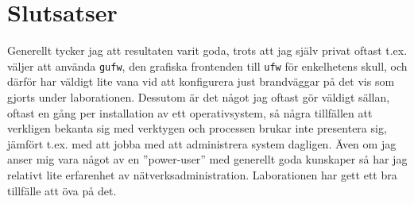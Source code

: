 \section{Slutsatser}
Generellt tycker jag att resultaten varit goda, trots att jag själv privat
oftast t.ex. väljer att använda \texttt{gufw}, den grafiska frontenden till
\texttt{ufw} för enkelhetens skull, och därför har väldigt lite vana vid att
konfigurera just brandväggar på det vis som gjorts under laborationen. Dessutom
är det något jag oftast gör väldigt sällan, oftast en gång per installation av
ett operativsystem, så några tillfällen att verkligen bekanta sig med verktygen
och processen brukar inte presentera sig, jämfört t.ex. med att jobba med att
administrera system dagligen. Även om jag anser mig vara något av en
''power-user'' med generellt goda kunskaper så har jag relativt lite erfarenhet
av nätverksadministration. Laborationen har gett ett bra tillfälle att öva på
det.
